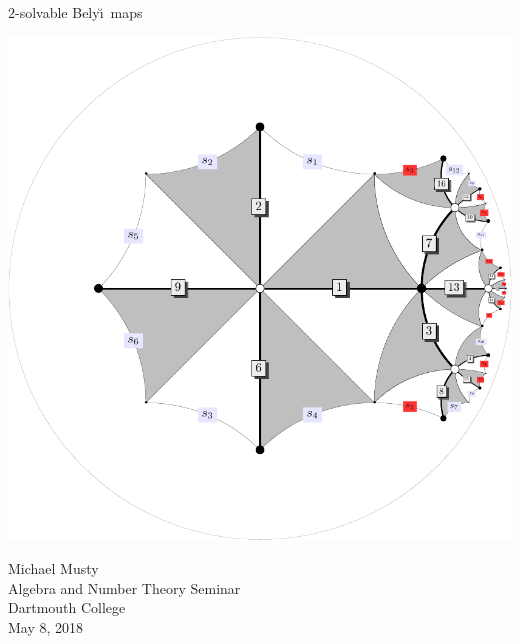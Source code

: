 \documentclass[xcolor=dvipsnames]{beamer}
\theoremstyle{plain}
\newcommand{\Belyi}{Bely\u{\i}}
\begin{document}
  \begin{frame}[plain]
    \begin{center}{
      \Huge\color{SeaGreen}
      $2$-solvable
      \Belyi\ maps
    }
    \end{center}
    \begin{center}
      \includegraphics[scale = 0.3]{16T8-g3.pdf}
    \end{center}
    \begin{center}
      Michael Musty\\
      Algebra and Number Theory Seminar\\
      Dartmouth College\\
      May 8, 2018
    \end{center}
  \end{frame}
\end{document}
